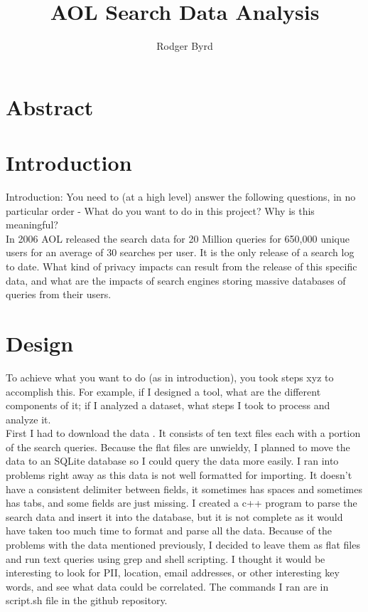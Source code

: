 \documentclass{article}
\begin{document}
\raggedright

\title{AOL Search Data Analysis}
\author{Rodger Byrd}
\maketitle

\section{Abstract}

\section{Introduction}
Introduction: You need to (at a high level) answer the following questions, in no particular order - What do you want to do in this project? Why is this meaningful? \\

In 2006 AOL released the search data for 20 Million queries for 650,000 unique users for an average of 30 searches per user. It is the only release of a search log to date. What kind of privacy impacts can result from the release of this specific data, and what are the impacts of search engines storing massive databases of queries from their users.
\section{Design}
To achieve what you want to do (as in introduction), you took steps xyz to accomplish this. For example, if I designed a tool, what are the different components of it; if I analyzed a dataset, what steps I took to process and analyze it.\\
First I had to download the data \cite{aol}. It consists of ten text files each with a portion of the search queries. Because the flat files are unwieldy, I planned to move the data to an SQLite database so I could query the data more easily. I ran into problems right away as this data is not well formatted for importing.  It doesn’t have a consistent delimiter between fields, it sometimes has spaces and sometimes has tabs, and some fields are just missing. I created a c++ program to parse the search data and insert it into the database, but it is not complete as it would have taken too much time to format and parse all the data. Because of the problems with the data mentioned previously, I decided to leave them as flat files and run text queries using grep and shell scripting. I thought it would be interesting to look for PII, location, email addresses, or other interesting key words, and see what data could be correlated. The commands I ran are in script.sh file in the github repository\cite{git}.
\end{document}
